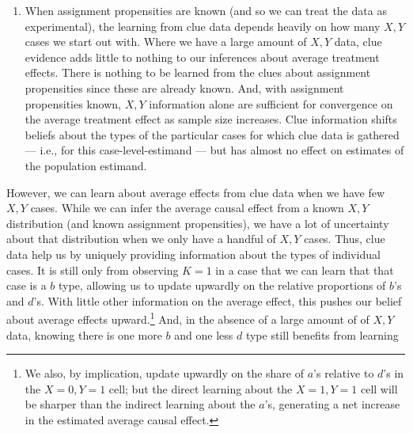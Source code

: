 \documentclass[
  12pt,
]{book}
\providecommand{\tightlist}{%
  \setlength{\itemsep}{0pt}\setlength{\parskip}{0pt}}
\begin{document}
\begin{enumerate}
\def\labelenumi{\arabic{enumi}.}
\setcounter{enumi}{1}
\tightlist
\item
  When assignment propensities are known (and so we can treat the data as experimental), the learning from clue data depends heavily on how many \(X,Y\) cases we start out with. Where we have a large amount of \(X,Y\) data, clue evidence adds little to nothing to our inferences about average treatment effects. There is nothing to be learned from the clues about assignment propensities since these are already known. And, with assignment propensities known, \(X,Y\) information alone are sufficient for convergence on the average treatment effect as sample size increases. Clue information shifts beliefs about the types of the particular cases for which clue data is gathered --- i.e., for this case-level-estimand --- but has almost no effect on estimates of the population estimand.
\end{enumerate}

However, we can learn about average effects from clue data when we have few \(X,Y\) cases. While we can infer the average causal effect from a known \(X,Y\) distribution (and known assignment propensities), we have a lot of uncertainty about that distribution when we only have a handful of \(X,Y\) cases. Thus, clue data help us by uniquely providing information about the types of individual cases. It is still only from observing \(K=1\) in a case that we can learn that that case is a \(b\) type, allowing us to update upwardly on the relative proportions of \(b\)'s and \(d\)'s. With little other information on the average effect, this pushes our belief about average effects upward.\footnote{We also, by implication, update upwardly on the share of \(a\)'s relative to \(d\)'s in the \(X=0, Y=1\) cell; but the direct learning about the \(X=1, Y=1\) cell will be sharper than the indirect learning about the \(a\)'s, generating a net increase in the estimated average causal effect.} And, in the absence of a large amount of of \(X,Y\) data, knowing there is one more \(b\) and one less \(d\) type still benefits from learning
\end{document}
